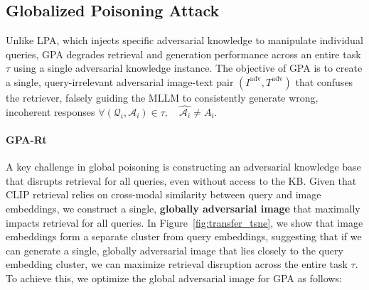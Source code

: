 \subsection{Globalized Poisoning Attack}
\label{sec:gpa}
Unlike LPA, which injects specific adversarial knowledge to manipulate individual queries, GPA degrades retrieval and generation performance across an entire task $\tau$ using a single adversarial knowledge instance. The objective of GPA is to create a single, query-irrelevant adversarial image-text pair $(I^{\text{adv}}, T^{\text{adv}})$ that confuses the retriever, falsely guiding the MLLM to consistently generate wrong, incoherent responses $\forall (\mathcal{Q}_i, \mathcal{A}_i) \in \tau,\quad \hat{\mathcal{A}_i} \neq A_i$.



\paragraph{GPA-Rt} A key challenge in global poisoning is constructing an adversarial knowledge base that disrupts retrieval for all queries, even without access to the KB. Given that CLIP retrieval relies on cross-modal similarity between query and image embeddings, we construct a single, \textbf{globally adversarial image} that maximally impacts retrieval for all queries. In Figure~\ref{fig:transfer_tsne}, we show that image embeddings form a separate cluster from query embeddings, suggesting that if we can generate a single, globally adversarial image that lies closely to the query embedding cluster, we can maximize retrieval disruption across the entire task $\tau$. To achieve this, we optimize the global adversarial image for GPA as follows:

